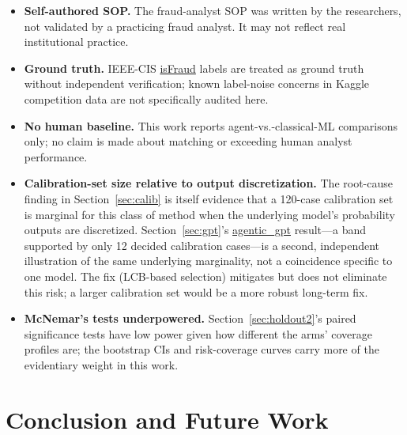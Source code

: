\documentclass[]{ieeeaccess}
\newcommand{\code}[1]{\url{#1}}
\begin{document}
\begin{itemize}
  stochasticity the way Section~\ref{sec:variance} does for Claude. \code{direct_control}
  was also not rerun for this model.
\item \textbf{Self-authored SOP.} The fraud-analyst SOP was written by
  the researchers, not validated by a practicing fraud analyst. It may
  not reflect real institutional practice.
\item \textbf{Ground truth.} IEEE-CIS \code{isFraud} labels are treated
  as ground truth without independent verification; known label-noise
  concerns in Kaggle competition data are not specifically audited here.
\item \textbf{No human baseline.} This work reports
  agent-vs.-classical-ML comparisons only; no claim is made about
  matching or exceeding human analyst performance.
\item \textbf{Calibration-set size relative to output discretization.}
  The root-cause finding in Section~\ref{sec:calib} is itself evidence that a
  120-case calibration set is marginal for this class of method when the
  underlying model's probability outputs are discretized. Section~\ref{sec:gpt}'s
  \code{agentic_gpt} result---a band supported by only 12 decided
  calibration cases---is a second, independent illustration of the same
  underlying marginality, not a coincidence specific to one model. The
  fix (LCB-based selection) mitigates but does not eliminate this risk; a
  larger calibration set would be a more robust long-term fix.
\item \textbf{McNemar's tests underpowered.} Section~\ref{sec:holdout2}'s paired
  significance tests have low power given how different the arms'
  coverage profiles are; the bootstrap CIs and risk-coverage curves
  carry more of the evidentiary weight in this work.
\end{itemize}

\section{Conclusion and Future Work}\label{sec:conclusion}
\end{document}

